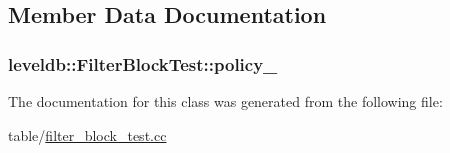 \subsection{Member Data Documentation}
\hypertarget{classleveldb_1_1_filter_block_test_ae52fe0fab92f8efc0c078b117cf43e67}{}
\subsubsection[{policy\+\_\+}]{ leveldb\+::\+Filter\+Block\+Test\+::policy\+\_\+}\label{classleveldb_1_1_filter_block_test_ae52fe0fab92f8efc0c078b117cf43e67}


The documentation for this class was generated from the following file\+:\begin{DoxyCompactItemize}
\item 
table/\hyperlink{filter__block__test_8cc}{filter\+\_\+block\+\_\+test.\+cc}\end{DoxyCompactItemize}
